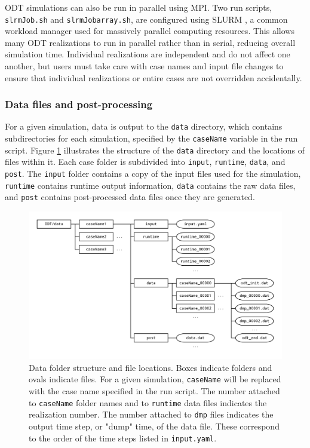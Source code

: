 \documentclass[preprint,12pt, a4paper]{elsarticle}
\begin{document}
ODT simulations can also be run in parallel using MPI. Two run scripts, \texttt{slrmJob.sh} and \texttt{slrmJob\textunderscore array.sh}, are configured using SLURM \cite{Yoo_2003}, a common workload manager used for massively parallel computing resources. This allows many ODT realizations to run in parallel rather than in serial, reducing overall simulation time. Individual realizations are independent and do not affect one another, but users must take care with case names and input file changes to ensure that individual realizations or entire cases are not overridden accidentally. 

\subsubsection{Data files and post-processing}

For a given simulation, data is output to the \texttt{data} directory, which contains subdirectories for each simulation, specified by the \texttt{caseName} variable in the run script. Figure \ref{fig:data_folder_structure} illustrates the structure of the \texttt{data} directory and the locations of files within it. Each case folder is subdivided into \texttt{input}, \texttt{runtime}, \texttt{data}, and \texttt{post}. The \texttt{input} folder contains a copy of the input files used for the simulation, \texttt{runtime} contains runtime output information, \texttt{data} contains the raw data files, and \texttt{post} contains post-processed data files once they are generated. 

\begin{figure}
	\centering
	\includegraphics[width=\textwidth]{../figures/data_folder_structure/data_folder_structure.png} 
	\caption{Data folder structure and file locations. Boxes indicate folders and ovals indicate files. For a given simulation, \texttt{caseName} will be replaced with the case name specified in the run script. The number attached to \texttt{caseName} folder names and to \texttt{runtime} data files indicates the realization number. The number attached to \texttt{dmp} files indicates the output time step, or "dump" time, of the data file. These correspond to the order of the time steps listed in \texttt{input.yaml}.}
	\label{fig:data_folder_structure}
\end{figure}
\end{document}

